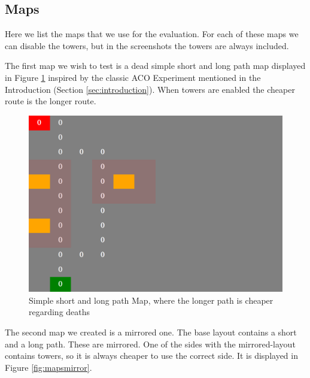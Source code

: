 \subsection{Maps}
\label{sec:testmaps}
Here we list the maps that we use for the evaluation. For each of these maps we can disable the towers, but in the screenshots the towers are always included.

The first map we wish to test is a dead simple short and long path map displayed in Figure \ref{fig:mapshortlong} inspired by the classic ACO Experiment mentioned in the Introduction (Section \ref{sec:introduction}). When towers are enabled the cheaper route is the longer route.

\begin{figure}[H]
  \centering
  \includegraphics[width=1\linewidth]{images/map_shortlong}
  \caption{Simple short and long path Map, where the longer path is cheaper regarding deaths}
  \label{fig:mapshortlong}
\end{figure}


The second map we created is a mirrored one. The base layout contains a short and a long path. These are mirrored. One of the sides with the mirrored-layout contains towers, so it is always cheaper to use the correct side. It is displayed in Figure \ref{fig:mapsmirror}.

